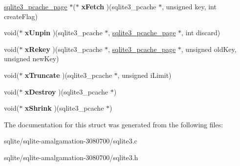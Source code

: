 \begin{DoxyCompactItemize}
\item 
\hypertarget{structsqlite3__pcache__methods2_ac74dd2b35193a4309494311995da2d25}{\hyperlink{structsqlite3__pcache__page}{sqlite3\+\_\+pcache\+\_\+page} $\ast$($\ast$ {\bfseries x\+Fetch} )(sqlite3\+\_\+pcache $\ast$, unsigned key, int create\+Flag)}\label{structsqlite3__pcache__methods2_ac74dd2b35193a4309494311995da2d25}

\item 
\hypertarget{structsqlite3__pcache__methods2_ac94294551eda282f17b1ed2a110e1850}{void($\ast$ {\bfseries x\+Unpin} )(sqlite3\+\_\+pcache $\ast$, \hyperlink{structsqlite3__pcache__page}{sqlite3\+\_\+pcache\+\_\+page} $\ast$, int discard)}\label{structsqlite3__pcache__methods2_ac94294551eda282f17b1ed2a110e1850}

\item 
\hypertarget{structsqlite3__pcache__methods2_a28a22927b108182e22025bbe6ba1f68e}{void($\ast$ {\bfseries x\+Rekey} )(sqlite3\+\_\+pcache $\ast$, \hyperlink{structsqlite3__pcache__page}{sqlite3\+\_\+pcache\+\_\+page} $\ast$, unsigned old\+Key, unsigned new\+Key)}\label{structsqlite3__pcache__methods2_a28a22927b108182e22025bbe6ba1f68e}

\item 
\hypertarget{structsqlite3__pcache__methods2_a7c565709ab91dbe7feb5b82c684ba604}{void($\ast$ {\bfseries x\+Truncate} )(sqlite3\+\_\+pcache $\ast$, unsigned i\+Limit)}\label{structsqlite3__pcache__methods2_a7c565709ab91dbe7feb5b82c684ba604}

\item 
\hypertarget{structsqlite3__pcache__methods2_a144d6e899889e80e00f93fb6c83359e2}{void($\ast$ {\bfseries x\+Destroy} )(sqlite3\+\_\+pcache $\ast$)}\label{structsqlite3__pcache__methods2_a144d6e899889e80e00f93fb6c83359e2}

\item 
\hypertarget{structsqlite3__pcache__methods2_af00c121e9c39b1df292711013c226ba5}{void($\ast$ {\bfseries x\+Shrink} )(sqlite3\+\_\+pcache $\ast$)}\label{structsqlite3__pcache__methods2_af00c121e9c39b1df292711013c226ba5}

\end{DoxyCompactItemize}


The documentation for this struct was generated from the following files\+:\begin{DoxyCompactItemize}
\item 
sqlite/sqlite-\/amalgamation-\/3080700/sqlite3.\+c\item 
sqlite/sqlite-\/amalgamation-\/3080700/sqlite3.\+h\end{DoxyCompactItemize}
